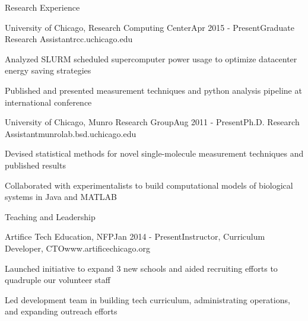 \documentclass{resume} %
\begin{document}
\begin{rSection}{Research Experience}

\begin{rSubsection}{University of Chicago, Research Computing Center}{Apr 2015 - Present}{Graduate Research Assistant}{rcc.uchicago.edu}
\item Analyzed SLURM scheduled supercomputer power usage to optimize datacenter energy saving strategies
\item Published and presented measurement techniques and python analysis pipeline at international conference

\end{rSubsection}

\begin{rSubsection}{University of Chicago, Munro Research Group}{Aug 2011 - Present}{Ph.D. Research Assistant}{munrolab.bsd.uchicago.edu}
	\item Devised statistical methods for novel single-molecule measurement techniques and published results
	\item Collaborated with experimentalists to build computational models of biological systems in Java and MATLAB
	
\end{rSubsection}
\end{rSection}

\begin{rSection}{Teaching and Leadership}
	
	
\begin{rSubsection}{Artifice Tech Education, NFP}{Jan 2014 - Present}{Instructor, Curriculum Developer, CTO}{www.artificechicago.org}
	\item Launched initiative to expand 3 new schools and aided recruiting efforts to quadruple our volunteer staff
	\item Led development team in building tech curriculum, administrating operations, and expanding outreach efforts
	
\end{rSubsection}
\end{rSection}

\end{document}
